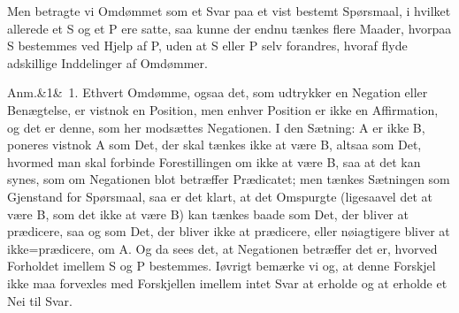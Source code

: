 \documentclass[12pt]{book}
\def\sperr#1{#1}%
\def\textit#1{#1}%
\def\emph#1{#1}%
\newcommand{\sperr}[1]{\textls[180]{#1}}
\newcommand{\anm}[1]{%
  \par\vspace{0.5\baselineskip}%
  \noindent\hspace{\parindent}\sperr{Anm.}\ifx&#1&\else~\textit{#1}.\fi
  \enspace\ignorespaces
}
\newcommand{\opage}[1]{\marginnote{\footnotesize\textit{[#1]}}}
\begin{document}
Men betragte vi Omdømmet som et Svar paa et vist bestemt Spørsmaal, i hvilket allerede et
\textit{S} og et \textit{P} ere satte, saa kunne der endnu
\opage{268} tænkes flere Maader, hvorpaa \textit{S} bestemmes ved Hjelp af \textit{P}, uden at
\textit{S} eller \textit{P} selv forandres, hvoraf flyde adskillige Inddelinger af
Omdømmer.

\anm{1} Ethvert Omdømme, ogsaa det, som udtrykker en Negation eller Benægtelse, er vistnok
en Position, men enhver Position er ikke en Affirmation, og det er denne, som her modsættes
\emph{Negationen}. I den Sætning: \textit{A} er ikke \textit{B}, poneres vistnok \textit{A}
som Det, der skal tænkes ikke at være \textit{B}, altsaa som Det, hvormed man skal forbinde
Forestillingen om ikke at være \textit{B}, saa at det kan synes, som om Negationen blot
betræffer Prædicatet; men tænkes Sætningen som Gjenstand for Spørsmaal, saa er det klart,
at det Omspurgte (ligesaavel det at være \textit{B}, som det ikke at være \textit{B}) kan
tænkes baade som Det, der bliver at prædicere, saa og som Det, der bliver ikke at
prædicere, eller nøiagtigere bliver at ikke=prædicere, om \textit{A}. Og da sees det, at
Negationen betræffer det \sperr{er}, hvorved Forholdet imellem \textit{S} og \textit{P}
bestemmes. Iøvrigt bemærke vi og, at denne Forskjel ikke maa forvexles med Forskjellen
imellem intet Svar at erholde og at erholde et Nei til Svar.
\end{document}
